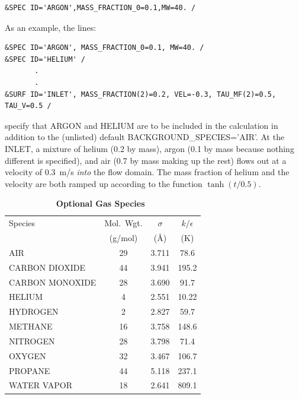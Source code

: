 \documentclass[11pt]{book}
\begin{document}
\footnotesize
\begin{verbatim}
&SPEC ID='ARGON',MASS_FRACTION_0=0.1,MW=40. /
\end{verbatim}
\normalsize



As an example, the lines:

\footnotesize
\begin{verbatim}
&SPEC ID='ARGON', MASS_FRACTION_0=0.1, MW=40. /
&SPEC ID='HELIUM' /
       .
       .
&SURF ID='INLET', MASS_FRACTION(2)=0.2, VEL=-0.3, TAU_MF(2)=0.5, TAU_V=0.5 /
\end{verbatim}
\normalsize
specify that {\ct ARGON} and {\ct HELIUM} are to be included in the calculation
in addition to the (unlisted) default
{\ct BACKGROUND\_SPECIES='AIR'}. At
the {\ct INLET}, a mixture of helium (0.2 by mass), argon (0.1 by mass
because nothing different is specified), and air (0.7 by mass making
up the rest) flows out at a velocity of 0.3~m/s {\em into} the flow
domain. The mass fraction of helium and the velocity are both
ramped up according to the function $\tanh(t/0.5)$.


\begin{table}[t]
\begin{center}
\caption{\bf Optional Gas Species~\cite{Reid:1}}
\label{tab:gasspecies}
\vspace{0.1in}
\begin{tabular}{|l|c|c|c|}
\hline
Species &   Mol.~Wgt.        & $\sigma$  & $k/\epsilon$  \\
        &   (g/mol)          & (\AA)     & (K)            \\ \hline
\hline
{\ct AIR}             & 29   & 3.711     & 78.6           \\ \hline
{\ct CARBON DIOXIDE}  & 44   & 3.941     &195.2           \\ \hline
{\ct CARBON MONOXIDE} & 28   & 3.690     & 91.7           \\ \hline
{\ct HELIUM}          &  4   & 2.551     & 10.22          \\ \hline
{\ct HYDROGEN}        &  2   & 2.827     & 59.7           \\ \hline
{\ct METHANE}         & 16   & 3.758     &148.6           \\ \hline
{\ct NITROGEN}        & 28   & 3.798     & 71.4           \\ \hline
{\ct OXYGEN}          & 32   & 3.467     &106.7           \\ \hline
{\ct PROPANE}         & 44   & 5.118     &237.1           \\ \hline
{\ct WATER VAPOR}     & 18   & 2.641     &809.1           \\ \hline
\end{tabular}
\end{center}
\end{table}
\end{document}
